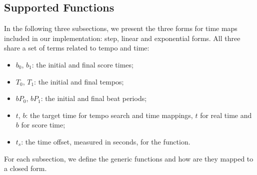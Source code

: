 \documentclass{sig-alternate}
\begin{document}
\subsection{Supported Functions} 
In the following three subsections, we present the three forms for time maps included in our implementation: step, linear and exponential forms. All three share a set of terms related to tempo and time:
\begin{itemize}
	\item $b_0$, $b_1$: the initial and final score times;
	\item $T_0$, $T_1$: the initial and final tempos;
	\item $bP_0$, $bP_1$: the initial and final beat periods;
	\item $t$, $b$: the target time for tempo search and time mappings, $t$ for real time and $b$ for score time;
	\item $t_s$: the time offset, measured in seconds, for the function.
\end{itemize}

For each subsection, we define the generic functions and how are they mapped to a closed form.
\end{document}

